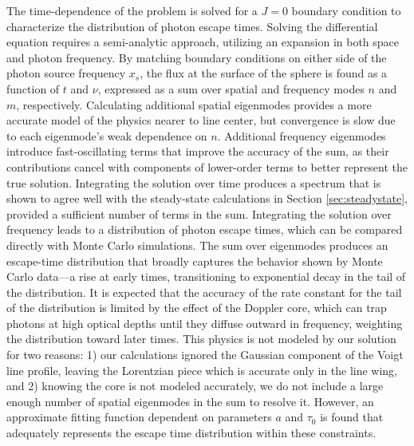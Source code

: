 \documentclass{aastex63}
\begin{document}
The time-dependence of the problem is solved for a $J=0$ boundary condition to characterize the distribution of photon escape times. Solving the differential equation requires a semi-analytic approach, utilizing an expansion in both space and photon frequency. By matching boundary conditions on either side of the photon source frequency $x_s$, the flux at the surface of the sphere is found as a function of $t$ and $\nu$, expressed as a sum over spatial and frequency modes $n$ and $m$, respectively. Calculating additional spatial eigenmodes provides a more accurate model of the physics nearer to line center, but convergence is slow due to each eigenmode's weak dependence on $n$. Additional frequency eigenmodes introduce fast-oscillating terms that improve the accuracy of the sum, as their contributions cancel with components of lower-order terms to better represent the true solution. Integrating the solution over time produces a spectrum that is shown to agree well with the steady-state calculations in Section \ref{sec:steadystate}, provided a sufficient number of terms in the sum. Integrating the solution over frequency leads to a distribution of photon escape times, which can be compared directly with Monte Carlo simulations. The sum over eigenmodes produces an escape-time distribution that broadly captures the behavior shown by Monte Carlo data---a rise at early times, transitioning to exponential decay in the tail of the distribution. It is expected that the accuracy of the rate constant for the tail of the distribution is limited by the effect of the Doppler core, which can trap photons at high optical depths until they diffuse outward in frequency, weighting the distribution toward later times. This physics is not modeled by our solution for two reasons: 1) our calculations ignored the Gaussian component of the Voigt line profile, leaving the Lorentzian piece which is accurate only in the line wing, and 2) knowing the core is not modeled accurately, we do not include a large enough number of spatial eigenmodes in the sum to resolve it. However, an approximate fitting function dependent on parameters $a$ and $\tau_0$ is found that adequately represents the escape time distribution within these constraints.
\end{document}
